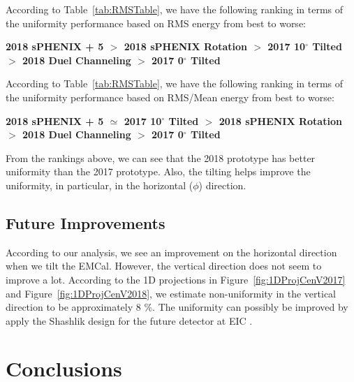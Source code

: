 \documentclass[hidelinks,11pt]{article}
\numberwithin{figure}{section}
\numberwithin{table}{section}
\newcommand{\degree}{\mbox{$^\circ$}\xspace}
\begin{document}
According to Table~\ref{tab:RMSTable}, we have the following ranking in terms of the uniformity performance based on RMS energy from best to worse:

\textbf{2018 sPHENIX + 5  $>$ 2018 sPHENIX Rotation $ >$  2017 10\degree Tilted  $>$ 2018 Duel Channeling $>$ 2017 0\degree Tilted}

According to Table~\ref{tab:RMSTable}, we have the following ranking in terms of the uniformity performance based on RMS/Mean energy from best to worse:

\textbf{2018 sPHENIX + 5 $ \simeq$ 2017 10\degree Tilted  $>$ 2018 sPHENIX Rotation $>$ 2018 Duel Channeling $>$ 2017 0\degree Tilted}

From the rankings above, we can see that the 2018 prototype has better uniformity than the 2017 prototype. Also, the tilting helps improve the uniformity, in particular, in the horizontal ($\phi$) direction.  

\subsection{Future Improvements}

According to our analysis, we see an improvement on the horizontal direction when we tilt the EMCal. However, the vertical direction does not seem to improve a lot. According to the 1D projections in Figure~\ref{fig:1DProjCenV2017} and Figure~\ref{fig:1DProjCenV2018}, we estimate non-uniformity in the vertical direction to be approximately 8 \%. The uniformity can possibly be improved by apply the Shashlik design for the future detector at EIC \cite{EICEMCal}. 




\section{Conclusions}
\end{document}
